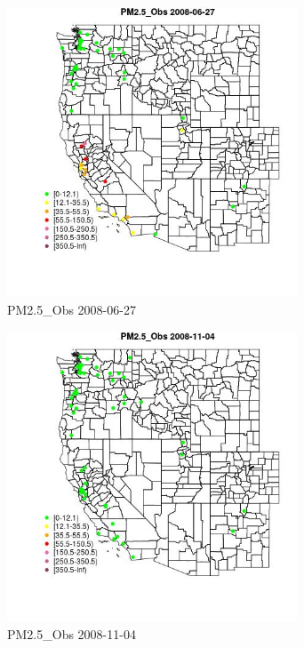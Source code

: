\begin{figure} 
\centering  
\includegraphics[width=0.77\textwidth]{Code_Outputs/Report_ML_input_PM25_Step4_part_e_de_duplicated_aves_MapObsPM25_Obs2008-06-27.jpg} 
\caption{\label{fig:Report_ML_input_PM25_Step4_part_e_de_duplicated_avesMapObsPM25_Obs2008-06-27}PM2.5_Obs 2008-06-27} 
\end{figure} 
 

\begin{figure} 
\centering  
\includegraphics[width=0.77\textwidth]{Code_Outputs/Report_ML_input_PM25_Step4_part_e_de_duplicated_aves_MapObsPM25_Obs2008-11-04.jpg} 
\caption{\label{fig:Report_ML_input_PM25_Step4_part_e_de_duplicated_avesMapObsPM25_Obs2008-11-04}PM2.5_Obs 2008-11-04} 
\end{figure} 
 

